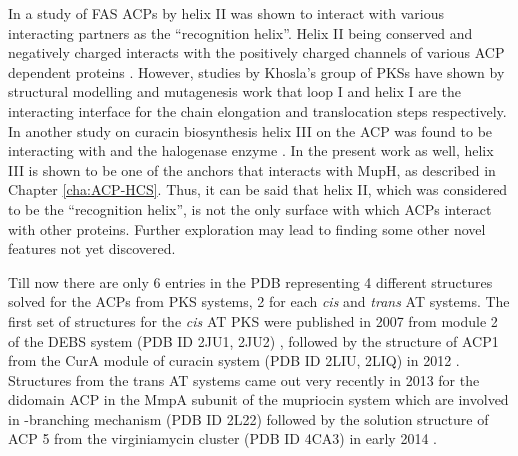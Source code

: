 			
			In a study of FAS ACPs by \textcite{Zhang2003} helix II was shown to interact with various interacting partners as the \textquotedblleft recognition helix\textquotedblright. Helix II being conserved and negatively charged interacts with the positively charged channels of various ACP dependent proteins \parencite{Zhang2001}. However, studies by Khosla's group of PKSs have shown by structural modelling and mutagenesis work that loop I and helix I are the interacting interface for the chain elongation and translocation steps respectively. In another study on curacin biosynthesis helix III on the ACP was found to be interacting with and the halogenase enzyme \parencite{Busche2012}. In the present work as well, helix III is shown to be one of the anchors that interacts with  MupH, as described in Chapter \ref{cha:ACP-HCS}. Thus, it can be said that helix II, which was considered to be the \textquotedblleft recognition helix\textquotedblright, is not the only surface with which ACPs interact with other proteins. Further exploration may lead to finding some other novel features not yet discovered.
			
			Till now there are only 6 entries in the PDB representing 4 different structures solved for the ACPs from PKS systems, 2 for each \textit{cis} and \textit{trans} AT systems. The first set of structures for the \textit{cis} AT PKS were published in 2007 from module 2 of the DEBS system (PDB ID 2JU1, 2JU2) \parencite{Alekseyev2007}, followed by the structure of ACP1 from the CurA module of curacin system (PDB ID 2LIU, 2LIQ) in 2012 \parencite{Busche2012}. Structures from the trans AT systems came out very recently in 2013 for the didomain ACP in the MmpA subunit of the mupriocin system which are involved in \bet-branching mechanism (PDB ID 2L22) \parencite{Haines2013} followed by the solution structure of ACP 5 from the virginiamycin cluster (PDB ID 4CA3) in early 2014 \parencite{Davison2014}.
			
